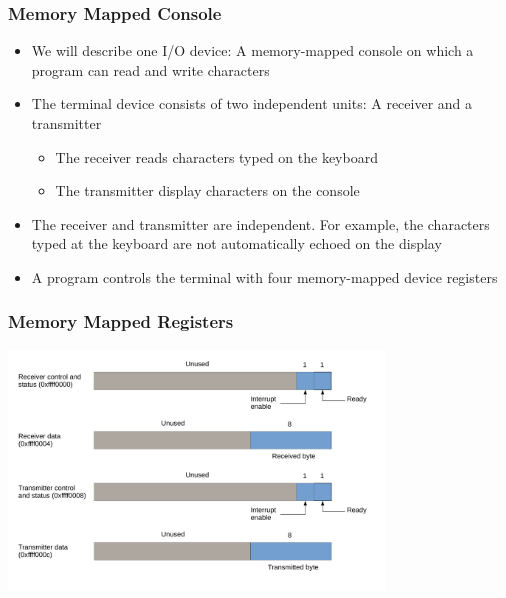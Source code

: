 \documentclass{beamer}
\begin{document}
\begin{frame}%
\frametitle{Memory Mapped Console}

\begin{itemize}
\item We will describe one I/O device: A memory-mapped console
  on which a program can read and write characters

\vspace{0.3cm}

\item The terminal device consists of two independent units: A receiver and a transmitter
  \begin{itemize}
  \item The receiver reads characters typed on the keyboard
  \item The transmitter display  characters  on  the  console
  \end{itemize}

  \vspace{0.3cm}

\item The receiver and transmitter are independent. For example, the characters typed at the keyboard are not automatically
echoed on the display

\vspace{0.3cm}

\item A program controls the terminal with four memory-mapped device registers
\end{itemize}

\end{frame}


\begin{frame}%
\frametitle{Memory Mapped Registers}

\scriptsize

\begin{center}
  \includegraphics[width=10cm]{terminal.pdf}
\end{center}

\end{frame}
\end{document}
